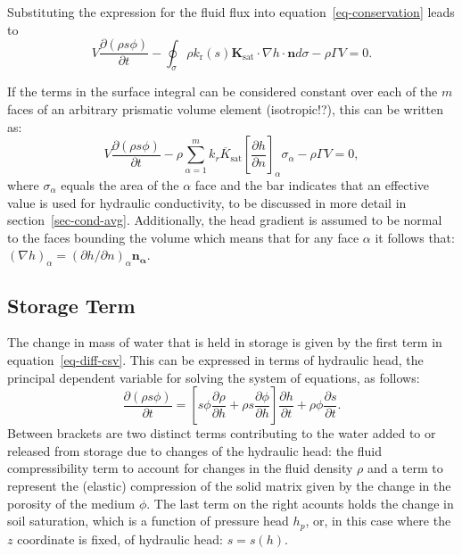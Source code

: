 \documentclass[fleqn]{article}
\begin{document}
Substituting the expression for the fluid flux into equation~\ref{eq-conservation}
leads to
\begin{equation}
  V \frac{\partial (\rho s \phi)}{\partial t} -
  \oint_\sigma \rho k_\text{r}(s) \mathbf{K}_{\textrm{sat}}
  \cdot \nabla h \cdot \mathbf{n} d\sigma -
  \rho \Gamma V = 0.
\end{equation}

If the terms in the surface integral can be considered constant over each of the 
$m$ faces of an arbitrary prismatic volume element (isotropic!?), 
this can be written as:
\begin{equation}
  V \frac{\partial (\rho s \phi)}{\partial t} -
  \rho \sum_{\alpha=1}^{m} \overline{k_r K_{\textrm{sat}}}
  \left[\frac{\partial h}{\partial n}\right]_\alpha \sigma_\alpha -
  \rho \Gamma V = 0,
  \label{eq-diff-csv}
\end{equation}
where $\sigma_\alpha$ equals the area of the $\alpha$ face and the bar indicates 
that an effective value is used for hydraulic conductivity, to be discussed 
in more detail in section~\ref{sec-cond-avg}. Additionally, the head 
gradient is assumed to be normal to the faces bounding the volume which
means that for any face $\alpha$ it follows that:
$(\nabla h)_\alpha = (\partial h/\partial n)_\alpha \mathbf{n_\alpha}$.

\subsection{Storage Term}
The change in mass of water that is held in storage is given by the first 
term in equation~\ref{eq-diff-csv}. This can be expressed in terms of hydraulic
head, the principal dependent variable for solving the system of equations,
as follows:
\begin{equation}
  \frac{\partial (\rho s \phi)}{\partial t} =
  \left[
    s \phi \frac{\partial \rho}{\partial h} +
    \rho s \frac{\partial \phi}{\partial h}
  \right]
  \frac{\partial h}{\partial t} +  
  \rho \phi \frac{\partial s}{\partial t}.
  \label{eq-sto-terms}
\end{equation}
Between brackets are two distinct terms contributing to the water
added to or released from storage due to changes of the hydraulic
head: the fluid compressibility term to account for changes in the
fluid density $\rho$ and a term to represent the (elastic)
compression of the solid matrix given by the change in the porosity
of the medium $\phi$. The last term on the right acounts holds the
change in soil saturation, which is a function of pressure head $h_p$, 
or, in this case where the $z$ coordinate is fixed, of hydraulic 
head: $s = s(h)$.
\end{document}
